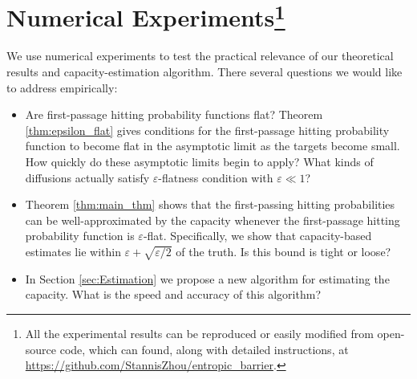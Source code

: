 \documentclass[12pt, nofootinbib,english, amsmath, amssymb, aps, priprint, graphicx,floatfix]{revtex4-1}
\newcommand{\theepsrate}{\varepsilon + \sqrt{\varepsilon/2}}
\theoremstyle{plain}
\theoremstyle{definition}
\theoremstyle{plain}
\begin{document}

                                                                               


\section{Numerical Experiments\footnote{All the experimental results can be reproduced or easily modified from open-source code, which can found, along with detailed instructions, at \url{https://github.com/StannisZhou/entropic_barrier}.}}\label{sec:Experiments}
We use numerical experiments to test the practical relevance of our theoretical results and capacity-estimation algorithm.  There several questions we would like to address empirically:

\begin{itemize}
    \item Are first-passage hitting probability functions flat?  Theorem \ref{thm:epsilon_flat} gives conditions for the first-passage hitting probability function to become flat in the asymptotic limit as the targets become small.  How quickly do these asymptotic limits begin to apply?  What kinds of diffusions actually satisfy $\varepsilon$-flatness condition with $\varepsilon \ll 1$?
	\item Theorem \ref{thm:main_thm} shows that the first-passing hitting probabilities can be well-approximated by the capacity whenever the first-passage hitting probability function is $\varepsilon$-flat.  Specifically, we show that capacity-based estimates lie within $\theepsrate$ of the truth.  Is this bound is tight or loose?
	\item In Section \ref{sec:Estimation} we propose a new algorithm for estimating the capacity.  What is the speed and accuracy of this algorithm?
\end{itemize}
\end{document}
